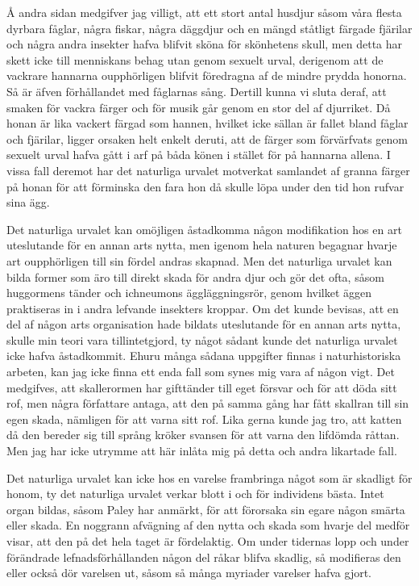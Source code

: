 Å andra sidan medgifver jag villigt, att ett stort antal husdjur såsom våra flesta dyrbara fåglar, några fiskar, några däggdjur och en mängd ståtligt färgade fjärilar och några andra insekter hafva blifvit sköna för skönhetens skull, men detta har skett icke till menniskans behag utan genom sexuelt urval, derigenom att de vackrare hannarna oupphörligen blifvit föredragna af de mindre prydda honorna. Så är äfven förhållandet med fåglarnas sång. Dertill kunna vi sluta deraf, att smaken för vackra färger och för musik går genom en stor del af djurriket. Då honan är lika vackert färgad som hannen, hvilket icke sällan är fallet bland fåglar och fjärilar, ligger orsaken helt enkelt deruti, att de färger som förvärfvats genom sexuelt urval hafva gått i arf på båda könen i stället för på hannarna allena. I vissa fall deremot har det naturliga urvalet motverkat samlandet af granna färger på honan för att förminska den fara hon då skulle löpa under den tid hon rufvar sina ägg.

Det naturliga urvalet kan omöjligen åstadkomma någon modifikation hos en art uteslutande för en annan arts nytta, men igenom hela naturen begagnar hvarje art oupphörligen till sin fördel andras skapnad. Men det naturliga urvalet kan bilda former som äro till direkt skada för andra djur och gör det ofta, såsom huggormens tänder och ichneumons äggläggningsrör, genom hvilket äggen praktiseras in i andra lefvande insekters kroppar. Om det kunde bevisas, att en del af någon arts organisation hade bildats uteslutande för en annan arts nytta, skulle min teori vara tillintetgjord, ty något sådant kunde det naturliga urvalet icke hafva åstadkommit. Ehuru många sådana uppgifter finnas i naturhistoriska arbeten, kan jag icke finna ett enda fall som synes mig vara af någon vigt. Det medgifves, att skallerormen har gifttänder till eget försvar och för att döda sitt rof, men några författare antaga, att den på samma gång har fått skallran till sin egen skada, nämligen för att varna sitt rof. Lika gerna kunde jag tro, att katten då den bereder sig till språng kröker svansen för att varna den lifdömda råttan. Men jag har icke utrymme att här inlåta mig på detta och andra likartade fall.

Det naturliga urvalet kan icke hos en varelse frambringa något som är skadligt för honom, ty det naturliga urvalet verkar blott i och för individens bästa. Intet organ bildas, såsom Paley har anmärkt, för att förorsaka sin egare någon smärta eller skada. En noggrann afvägning af den nytta och skada som hvarje del medför visar, att den på det hela taget är fördelaktig. Om under tidernas lopp och under förändrade lefnadsförhållanden någon del råkar blifva skadlig, så modifieras den eller också dör varelsen ut, såsom så många myriader varelser hafva gjort.

